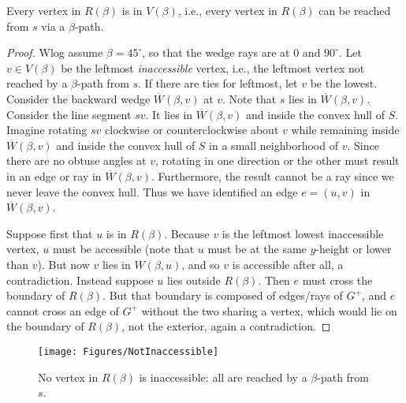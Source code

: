\documentclass{cccg17}
\newcommand{\bluenew}[1]{{#1}}  %
\newcommand{\rednote}[1]{{}}  %
\newcommand{\lemlab}[1]{\label{lemma:#1}}
\newcommand{\figlab}[1]{\label{fig:#1}}
\def\b{{\beta}}
\begin{document}
\begin{lemma}
Every vertex in $R(\b)$ is in $V(\b)$, i.e., every
vertex in $R(\b)$ can be reached from $s$ via a $\b$-path.
\lemlab{RincludesVerts}
\end{lemma}
\begin{proof}
Wlog assume $\b=45^\circ$, so that the wedge rays are at $0$ and $90^\circ$.
Let $v \in V(\b)$ be the leftmost \emph{inaccessible} vertex, i.e., the leftmost vertex not
reached by a $\b$-path from $s$. %
If there are ties for leftmost, let $v$ be the lowest.
Consider the \bluenew{backward} wedge $\overline{W}(\b,v)$ at $v$. 
Note that $s$ lies in $\overline{W}(\b,v)$.  Consider the line segment $sv$.  It lies in $\overline{W}(\b,v)$ and inside the convex hull of $S$.  Imagine rotating $sv$ clockwise or counterclockwise about $v$ while remaining inside $\overline{W}(\b,v)$ and inside the convex hull of $S$ in a small neighborhood of $v$. 
Since there are no obtuse angles at $v$, rotating in one direction or the other must result in an edge or ray in  $\overline{W}(\b,v)$.
Furthermore,  the result cannot be a ray since we never leave the convex hull.  Thus we have identified an edge $e=(u,v)$ in $\overline{W}(\b,v)$.
\rednote{Rev1: ``I guess this part is unnecessarily complicated. The existence of this edge comes from property (1) applied to wedge $W(\pi+\beta,v)$."
JOR: I think I prefer the text as-is, bringing in the hull, and not-a-ray.
And I don't particularly like using $W(\pi+\beta,v)$.
But I will let you decide on whether to revise this argument.  AL: Yes, I agree, let's leave our text as is.}

Suppose first that $u$ is in $R(\b)$. Because $v$ is the leftmost lowest inaccessible
vertex, $u$ must be accessible 
(note that $u$ must be at \bluenew{the same $y$-height} or lower than $v$).
But now $v$ lies in $W(\b,u)$, and so \bluenew{$v$} is accessible after all, a contradiction.
Instead suppose $u$ lies outside $R(\b)$.
Then $e$ must cross the boundary of $R(\b)$. 
But that boundary is composed of edges/rays of $G^+$, and $e$ cannot cross
an edge of $G^+$ without the two sharing a vertex, which would lie on the
boundary of $R(\b)$, not the exterior, again a contradiction.
\end{proof}

\begin{figure}[htbp]
\centering
\texttt{[image: Figures/NotInaccessible]}
\caption{No vertex in $R(\b)$ is inaccessible: all are reached by a $\b$-path from $s$.
}
\figlab{NotInaccessible}
\end{figure}
\end{document}
